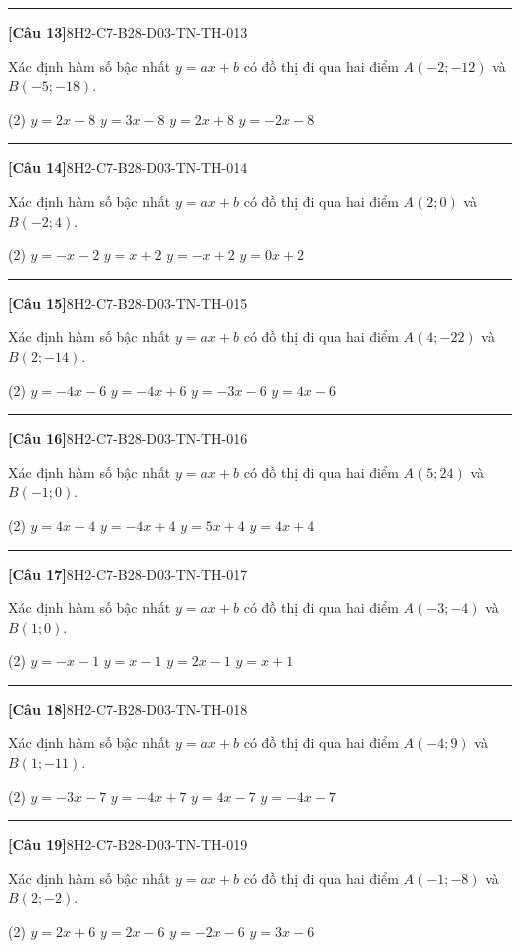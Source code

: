 \documentclass[12pt,a4paper]{article}
\newif\ifloigiai
\newenvironment{cauhoi}[2]{%
  \par\medskip\noindent\rule{\textwidth}{0.4pt}\par\nopagebreak
  \noindent\textbf{[#1]}\hfill{\scriptsize\ttfamily #2}\par\nopagebreak\smallskip}{\par}
\newcommand{\dapan}[1]{\ifloigiai\par\smallskip\noindent\textit{Đáp án:} \textbf{#1}\par\fi}
\begin{document}
\begin{cauhoi}{Câu 13}{8H2-C7-B28-D03-TN-TH-013}
Xác định hàm số bậc nhất $y=ax+b$ có đồ thị đi qua hai điểm $A(-2;-12)$ và $B(-5;-18)$.
\begin{tasks}(2)
\task $y=2x-8$
\task $y=3x-8$
\task $y=2x+8$
\task $y=-2x-8$
\end{tasks}
\dapan{A}
\end{cauhoi}
\begin{cauhoi}{Câu 14}{8H2-C7-B28-D03-TN-TH-014}
Xác định hàm số bậc nhất $y=ax+b$ có đồ thị đi qua hai điểm $A(2;0)$ và $B(-2;4)$.
\begin{tasks}(2)
\task $y=-x-2$
\task $y=x+2$
\task $y=-x+2$
\task $y=0x+2$
\end{tasks}
\dapan{C}
\end{cauhoi}
\begin{cauhoi}{Câu 15}{8H2-C7-B28-D03-TN-TH-015}
Xác định hàm số bậc nhất $y=ax+b$ có đồ thị đi qua hai điểm $A(4;-22)$ và $B(2;-14)$.
\begin{tasks}(2)
\task $y=-4x-6$
\task $y=-4x+6$
\task $y=-3x-6$
\task $y=4x-6$
\end{tasks}
\dapan{A}
\end{cauhoi}
\begin{cauhoi}{Câu 16}{8H2-C7-B28-D03-TN-TH-016}
Xác định hàm số bậc nhất $y=ax+b$ có đồ thị đi qua hai điểm $A(5;24)$ và $B(-1;0)$.
\begin{tasks}(2)
\task $y=4x-4$
\task $y=-4x+4$
\task $y=5x+4$
\task $y=4x+4$
\end{tasks}
\dapan{D}
\end{cauhoi}
\begin{cauhoi}{Câu 17}{8H2-C7-B28-D03-TN-TH-017}
Xác định hàm số bậc nhất $y=ax+b$ có đồ thị đi qua hai điểm $A(-3;-4)$ và $B(1;0)$.
\begin{tasks}(2)
\task $y=-x-1$
\task $y=x-1$
\task $y=2x-1$
\task $y=x+1$
\end{tasks}
\dapan{B}
\end{cauhoi}
\begin{cauhoi}{Câu 18}{8H2-C7-B28-D03-TN-TH-018}
Xác định hàm số bậc nhất $y=ax+b$ có đồ thị đi qua hai điểm $A(-4;9)$ và $B(1;-11)$.
\begin{tasks}(2)
\task $y=-3x-7$
\task $y=-4x+7$
\task $y=4x-7$
\task $y=-4x-7$
\end{tasks}
\dapan{D}
\end{cauhoi}
\begin{cauhoi}{Câu 19}{8H2-C7-B28-D03-TN-TH-019}
Xác định hàm số bậc nhất $y=ax+b$ có đồ thị đi qua hai điểm $A(-1;-8)$ và $B(2;-2)$.
\begin{tasks}(2)
\task $y=2x+6$
\task $y=2x-6$
\task $y=-2x-6$
\task $y=3x-6$
\end{tasks}
\dapan{B}
\end{cauhoi}
\end{document}
